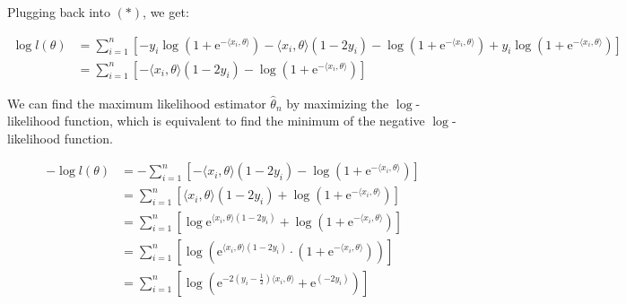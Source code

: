 \documentclass{article}
\begin{document}
Plugging back into $(*)$, we get:

\begin{equation*}
    \begin{split}
        \log l(\theta) 
        &= \sum_{i=1}^n \left[ -y_i \log \left( 1 + \mathrm{e}^{-\langle x_i, \theta \rangle} \right) - \langle x_i, \theta \rangle(1 - 2y_i) - \log \left( 1 + \mathrm{e}^{-\langle x_i, \theta \rangle} \right) + y_i \log \left( 1 + \mathrm{e}^{-\langle x_i, \theta \rangle} \right) \right] \\
        &= \sum_{i=1}^n \left[ - \langle x_i, \theta \rangle(1 - 2y_i) - \log \left( 1 + \mathrm{e}^{-\langle x_i, \theta \rangle} \right) \right]
    \end{split}
\end{equation*}

We can find the maximum likelihood estimator $\hat{\theta}_n$ by maximizing the $\log$-likelihood function,
which is equivalent to find the minimum of the negative $\log$-likelihood function.

\begin{align*}
    - \log l(\theta) 
    &= - \sum_{i=1}^n \left[ - \langle x_i, \theta \rangle(1 - 2y_i) - \log \left( 1 + \mathrm{e}^{-\langle x_i, \theta \rangle} \right) \right] \\
    &= \sum_{i=1}^n \left[ \langle x_i, \theta \rangle(1 - 2y_i) + \log \left( 1 + \mathrm{e}^{-\langle x_i, \theta \rangle} \right) \right] \\
    &= \sum_{i=1}^n \left[ \log \mathrm{e}^{\langle x_i, \theta \rangle (1 - 2y_i)} + \log \left( 1 + \mathrm{e}^{-\langle x_i, \theta \rangle} \right) \right] \\
    &= \sum_{i=1}^n \left[ \log \left( \mathrm{e}^{\langle x_i, \theta \rangle (1 - 2y_i)} \cdot \left( 1 + \mathrm{e}^{-\langle x_i, \theta \rangle} \right) \right) \right] \\
    &= \sum_{i=1}^n \left[ \log \left( \mathrm{e}^{-2(y_i - \frac{1}{2})\langle x_i, \theta \rangle} + \mathrm{e}^{(- 2y_i)} \right) \right] \\
\end{align*}
\end{document}
